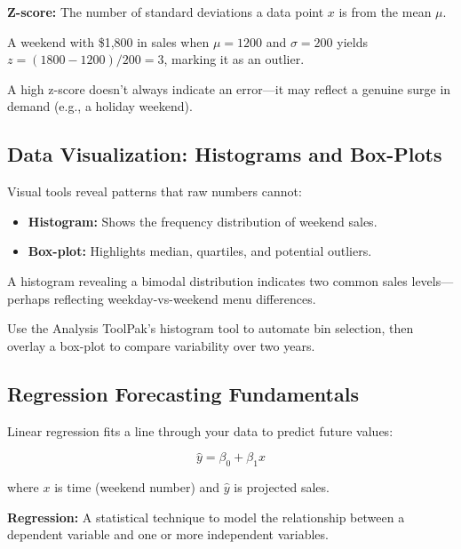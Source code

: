 \begin{Definition}
\textbf{Z-score:} The number of standard deviations a data point \(x\) is from the mean \(\mu\).
\end{Definition}

\begin{Example}
A weekend with \$1,800 in sales when \(\mu=1200\) and \(\sigma=200\) yields \(z=(1800-1200)/200=3\), marking it as an outlier.
\end{Example}

\begin{Warning}
A high z-score doesn’t always indicate an error—it may reflect a genuine surge in demand (e.g., a holiday weekend).
\end{Warning}

\subsection{Data Visualization: Histograms and Box-Plots}
Visual tools reveal patterns that raw numbers cannot:

\begin{itemize}
  \item \textbf{Histogram:} Shows the frequency distribution of weekend sales.
  \item \textbf{Box-plot:} Highlights median, quartiles, and potential outliers.
\end{itemize}

\begin{Example}
A histogram revealing a bimodal distribution indicates two common sales levels—perhaps reflecting weekday-vs-weekend menu differences.
\end{Example}

\begin{Tip}
Use the Analysis ToolPak’s histogram tool to automate bin selection, then overlay a box-plot to compare variability over two years.
\end{Tip}

\subsection{Regression Forecasting Fundamentals}
Linear regression fits a line through your data to predict future values:

\[
\hat{y} = \beta_0 + \beta_1 x
\]

where \(x\) is time (weekend number) and \(\hat{y}\) is projected sales.

\begin{Definition}
\textbf{Regression:} A statistical technique to model the relationship between a dependent variable and one or more independent variables.
\end{Definition}

